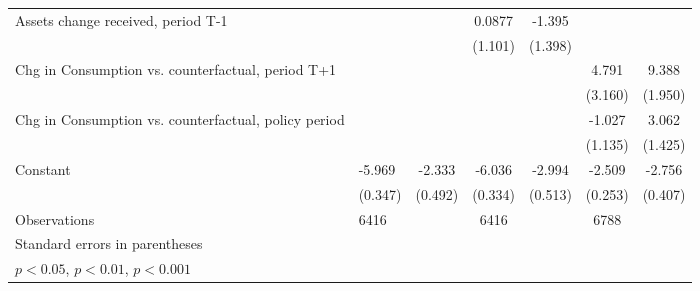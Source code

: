 \begin{table}[htbp]
\begin{tabular}{p{0.8in}l*{5}{c}}
Assets change received, period T-1&                     &                     &      0.0877         &      -1.395         &                     &                     \\
                    &                     &                     &     (1.101)         &     (1.398)         &                     &                     \\
Chg in Consumption vs. counterfactual, period T+1&                     &                     &                     &                     &       4.791         &       9.388\sym{***}\\
                    &                     &                     &                     &                     &     (3.160)         &     (1.950)         \\
Chg in Consumption vs. counterfactual, policy period&                     &                     &                     &                     &      -1.027         &       3.062\sym{*}  \\
                    &                     &                     &                     &                     &     (1.135)         &     (1.425)         \\
Constant            &      -5.969\sym{***}&      -2.333\sym{***}&      -6.036\sym{***}&      -2.994\sym{***}&      -2.509\sym{***}&      -2.756\sym{***}\\
                    &     (0.347)         &     (0.492)         &     (0.334)         &     (0.513)         &     (0.253)         &     (0.407)         \\
\hline
Observations        &        6416         &                     &        6416         &                     &        6788         &                     \\
\hline\hline
\multicolumn{7}{l}{\footnotesize Standard errors in parentheses}\\
\multicolumn{7}{l}{\footnotesize \sym{*} \(p<0.05\), \sym{**} \(p<0.01\), \sym{***} \(p<0.001\)}\\
\end{tabular}
\end{table}
